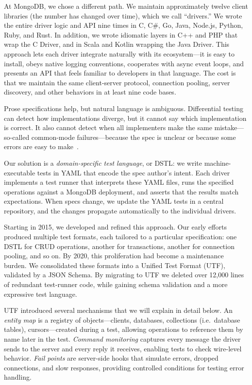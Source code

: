 \documentclass[conference]{IEEEtran}
\begin{document}
At MongoDB, we chose a different path. We maintain approximately twelve client libraries (the number has changed over time), which we call ``drivers.'' We wrote the entire driver logic and API nine times in C, C\#, Go, Java, Node.js, Python, Ruby, and Rust. In addition, we wrote idiomatic layers in C++ and PHP that wrap the C Driver, and in Scala and Kotlin wrapping the Java Driver. This approach lets each driver integrate naturally with its ecosystem---it is easy to install, obeys native logging conventions, cooperates with async event loops, and presents an API that feels familiar to developers in that language. The cost is that we maintain the same client-server protocol, connection pooling, server discovery, and other behaviors in at least nine code bases.

Prose specifications help, but natural language is ambiguous. Differential testing~\cite{mckeeman_differential_1998} can detect how implementations diverge, but it cannot say which implementation is correct. It also cannot detect when all implementers make the same mistake---so-called common-mode failures---because the spec is unclear or because some errors are easy to make~\cite{brilliant_consistent_1987}.

Our solution is a \emph{domain-specific test language}, or DSTL: we write machine-executable tests in YAML that encode the spec author's intent. Each driver implements a test runner that interprets these YAML files, runs the specified operations against a MongoDB deployment, and asserts that the results match expectations. When specs change, we update the YAML tests in a central repository, and the changes propagate automatically to the individual drivers.

Starting in 2015, we developed and refined this approach. Our early efforts produced multiple test formats, each tailored to a particular specification: one DSTL for CRUD operations, another for transactions, another for connection pooling, and so on. By 2020, this proliferation had become a maintenance burden. We consolidated these formats into a Unified Test Format (UTF), validated by a JSON Schema. By migrating to UTF we deleted over 12,000 lines of redundant test-runner code, while gaining schema validation and a more expressive test language.

UTF introduced several mechanisms that we will explain in detail below. An \emph{entity map} is a registry of objects---clients, databases, collections (i.e.\ database tables), cursors---created during a test, allowing operations to reference them by name later in the test. \emph{Command monitoring} captures every message the driver sends to the server and every reply it receives, enabling tests to check wire-level behavior. \emph{Fail points} are server-side hooks that simulate errors, dropped connections, and slow responses, providing controlled conditions for testing error handling.
\end{document}
